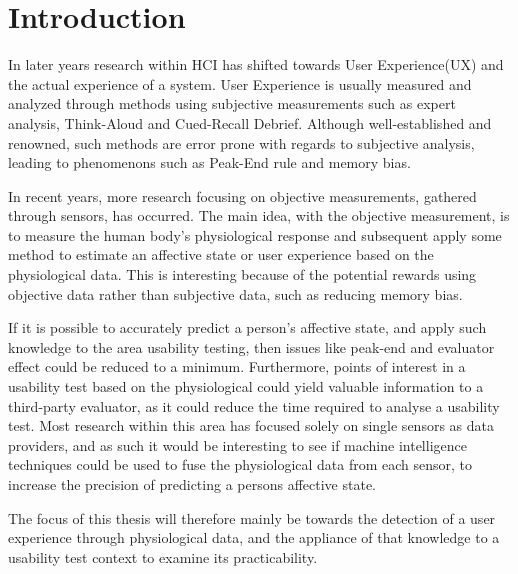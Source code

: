 \chapter{Introduction}
In later years research within HCI has shifted towards User Experience(UX) and the actual experience of a system.
User Experience is usually measured and analyzed through methods using subjective measurements such as expert analysis, Think-Aloud and Cued-Recall Debrief.
Although well-established and renowned, such methods are error prone with regards to subjective analysis, leading to
phenomenons such as Peak-End rule\cite{cockburn_peakend} and memory bias.

In recent years, more research focusing on objective measurements, gathered through sensors, has occurred. 
The main idea, with the objective measurement, is to measure the human body's physiological response and subsequent apply some method to estimate an affective state or user experience based on the physiological data.
This is interesting because of the potential rewards using objective data rather than subjective data, such as reducing memory bias.

If it is possible to accurately predict a person's affective state, and apply such knowledge to the area usability testing, then issues like peak-end and evaluator effect\cite{eval_effect_research} could be reduced to a minimum.
Furthermore, points of interest in a usability test based on the physiological could yield valuable information to a third-party evaluator, as it could reduce the time required to analyse a usability test.
Most research within this area has focused solely on single sensors as data providers, and as such it would be
interesting to see if machine intelligence techniques could be used to fuse the physiological data from each sensor, to increase the precision of predicting a persons affective state.

The focus of this thesis will therefore mainly be towards the detection of a user experience through physiological data, and the appliance of that knowledge to a usability test context to examine its practicability.
